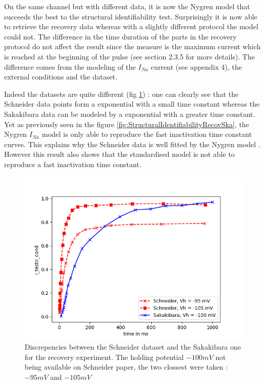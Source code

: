 \documentclass[11pt]{report}
\begin{document}
On the same channel but with different data, it is now the Nygren \cite{Nygren1998} model that succeeds the best to the structural identifiability test. Surprisingly it is now able to retrieve the recovery data whereas with a slightly different protocol the model could not. The difference in the time duration of the parts in the recovery protocol do not affect the result since the measure is the maximum current which is reached at the beginning of the pulse (see section 2.3.5 for more details). The difference comes from the modeling of the $I_{Na}$ current (see appendix 4), the external conditions and the dataset. 

Indeed the datasets are quite different (fig \ref{fig:RecoveryDataComparison}) : one can clearly see that the Schneider \cite{Schneider1994} data points form a exponential with a small time constant whereas the Sakakibara \cite{Sakakibara1992} data can be modeled by a exponential with a greater time constant. Yet as previously seen in the figure \ref{fig:StructuralIdentifiabilityRecovSka}, the Nygren $I_{Na}$ model \cite{Nygren1998} is only able to reproduce the fast inactivation time constant curves. This explains why the Schneider \cite{Schneider1994} data is well fitted by the Nygren model \cite{Nygren1998}. However this result also shows that the standardised model is not able to reproduce a fast inactivation time constant.

\begin{figure}[H]
    \centering
    \begin{measuredfigure}
\includegraphics[scale = 0.55 ]{figures/recovdataIna.png}
    \captionsetup{singlelinecheck = false, format= hang, justification=centerlast, labelsep=space}
	\caption{Discrepencies between the Schneider \cite{Schneider1994} dataset and the Sakakibara \cite{Sakakibara1992} one for the recovery experiment. The holding potential $-100 mV$ not being available on Schneider \cite{Schneider1994} paper, the two clossest were taken : $-95 mV$ and $-105 mV$}
	\end{measuredfigure}
      \addtocounter{figure}{-1}
	\label{fig:RecoveryDataComparison}
\end{figure}
\end{document}
